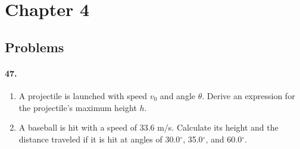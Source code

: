 


\renewcommand\assignment{HW 4, Due Friday, 2/17/2023 23:59; \S4 P: \#47, 51, 5(?), 60, 67  \S4 Q: \# 14, 15 P: \#32, 39, 41}
\setlength{\belowdisplayskip}{0pt} \setlength{\belowdisplayshortskip}{0pt}
\setlength{\abovedisplayskip}{0pt} \setlength{\abovedisplayshortskip}{0pt}



    \iffalse
    \begin{equation*}
        \begin{gathered}
            Equations go here.
        \end{gathered}
    \end{equation*}

    \resizebox{\hsize}{!}{$Long equation goes here$}

    \begin{multicol*}{# of columns}
    \end{multicol*}

    \horizontal

    \fi


    \section*{Chapter 4}
    \subsection*{Problems}

    \paragraph*{47.}
    \begin{enumerate}[label=\alph*.]
        \item A projectile is launched with speed $v_0$ and angle $\theta$. Derive an expression for the projectile's maximum height $h$.
        \item A baseball is hit with a speed of 33.6 m/s. Calculate its height and the distance traveled if it is hit at angles of 30.0$^\circ$, 35.0$^\circ$, and 60.0$^\circ$.
    \end{enumerate}

